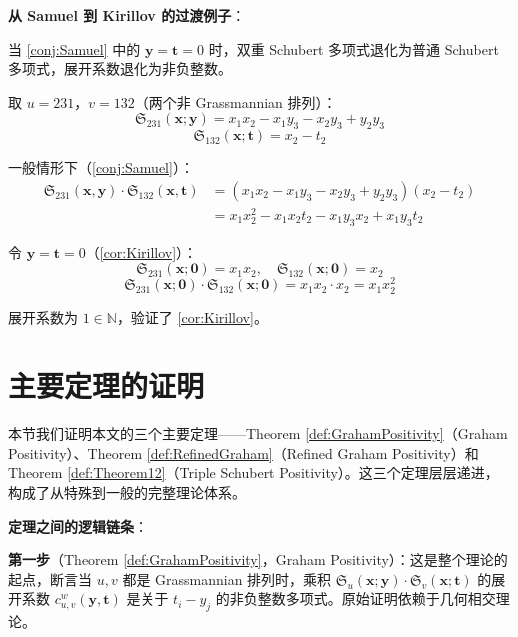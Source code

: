 \textbf{从 Samuel 到 Kirillov 的过渡例子}：

\begin{Example}
\label{ex:SamuelToKirillov}

当 \cref{conj:Samuel} 中的 $\mathbf{y} = \mathbf{t} = 0$ 时，双重 Schubert 多项式退化为普通 Schubert 多项式，展开系数退化为非负整数。

取 $u = 231$，$v = 132$（两个非 Grassmannian 排列）：
$$\mathfrak{S}_{231}(\mathbf{x}; \mathbf{y}) = x_1 x_2 - x_1 y_3 - x_2 y_3 + y_2 y_3$$
$$\mathfrak{S}_{132}(\mathbf{x}; \mathbf{t}) = x_2 - t_2$$

一般情形下（\cref{conj:Samuel}）：
\begin{align*}
\mathfrak{S}_{231}(\mathbf{x},\mathbf{y}) \cdot \mathfrak{S}_{132}(\mathbf{x},\mathbf{t})
&= (x_1 x_2 - x_1 y_3 - x_2 y_3 + y_2 y_3)(x_2 - t_2) \\
&= x_1 x_2^2 - x_1 x_2t_2 - x_1 y_3x_2 + x_1 y_3t_2
\end{align*}

令 $\mathbf{y} = \mathbf{t} = 0$（\cref{cor:Kirillov}）：
$$\mathfrak{S}_{231}(\mathbf{x}; \mathbf{0}) = x_1 x_2, \quad \mathfrak{S}_{132}(\mathbf{x}; \mathbf{0}) = x_2$$
$$\mathfrak{S}_{231}(\mathbf{x}; \mathbf{0}) \cdot \mathfrak{S}_{132}(\mathbf{x}; \mathbf{0}) = x_1 x_2 \cdot x_2 = x_1 x_2^2$$

展开系数为 $1 \in \mathbb{N}$，验证了 \cref{cor:Kirillov}。
\end{Example}

\section{主要定理的证明}
\label{sec:ProofMain}

本节我们证明本文的三个主要定理——Theorem \cref{def:GrahamPositivity}（Graham Positivity）、Theorem \cref{def:RefinedGraham}（Refined Graham Positivity）和 Theorem \cref{def:Theorem12}（Triple Schubert Positivity）。这三个定理层层递进，构成了从特殊到一般的完整理论体系。

\textbf{定理之间的逻辑链条}：

\textbf{第一步}（Theorem \cref{def:GrahamPositivity}，Graham Positivity）：这是整个理论的起点，断言当 $u, v$ 都是 Grassmannian 排列时，乘积 $\mathfrak{S}_u(\mathbf{x};\mathbf{y}) \cdot \mathfrak{S}_v(\mathbf{x};\mathbf{t})$ 的展开系数 $c^w_{u,v}(\mathbf{y},\mathbf{t})$ 是关于 $t_i - y_j$ 的非负整数多项式。原始证明依赖于几何相交理论。


